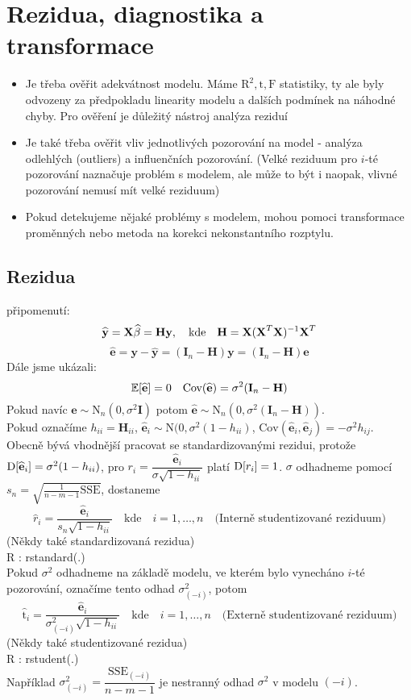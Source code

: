 \chapter{Rezidua, diagnostika a transformace}
\begin{itemize}
 \item Je třeba ověřit adekvátnost modelu. Máme $ \text{R}^{2} , \text{t}, \text{F} $ statistiky, ty ale byly odvozeny za předpokladu linearity modelu a dalších podmínek na náhodné chyby. Pro ověření je důležitý nástroj analýza reziduí
 \item Je také třeba ověřit vliv jednotlivých pozorování na model - analýza odlehlých (outliers) a influenčních pozorování. (Velké reziduum pro $ i $-té pozorování naznačuje problém s modelem, ale může to být i naopak, vlivné pozorování nemusí mít velké reziduum)
 \item Pokud detekujeme nějaké problémy s modelem, mohou pomoci transformace proměnných nebo metoda na korekci nekonstantního rozptylu.
\end{itemize}
\section{Rezidua}
připomenutí:
$$
 \widehat{\textbf{y}} = \textbf{X} \widehat{\beta} = \textbf{Hy} , \quad \text{kde} \quad \textbf{H} = \textbf{X} ( \textbf{X} ^{T} \textbf{X} )^{-1} \textbf{X} ^{T}
$$
$$
 \widehat{\textbf{e}} = \textbf{y} - \widehat{\textbf{y}} = ( \textbf{I}_n - \textbf{H} ) \textbf{y} =  ( \textbf{I}_n - \textbf{H} ) \textbf{e}
$$
Dále jsme ukázali:
$$
\mathbb{E} [ \widehat{\textbf{e}} ] = 0 \quad \text{Cov}(  \widehat{\textbf{e}} ) = \sigma^{2} ( \textbf{I}_n - \textbf{H} )
$$
Pokud navíc 
$
\textbf{e} \sim \text{N}_n ( 0 ,\sigma^{2} \textbf{I} ) $ potom $ \widehat{\textbf{e}} \sim \text{N}_n ( 0 ,\sigma^{2} ( \textbf{I}_n - \textbf{H})) 
$. \\ Pokud označíme $ h_{ii} = \textbf{H}_{ii} $, $ \widehat{\textbf{e}}_i \sim \text{N} ( 0 , \sigma^2 (1 - h_{ii} ) $, $ \text{Cov}( \widehat{\textbf{e}}_i , \widehat{\textbf{e}}_j  ) = -\sigma^2 h_{ij} $. \\
Obecně bývá vhodnější pracovat se standardizovanými rezidui, protože $ \mathrm{D} [  \widehat{\textbf{e}}_i ] = \sigma^2 (1 - h_{ii} ) $, pro $ r_i = \dfrac{\widehat{\textbf{e}}_i}{\sigma \sqrt{1-h_{ii}}} $ platí $ \mathrm{D} [ r_i ] = 1 $.
$ \sigma $ odhadneme pomocí $ s_n =  \sqrt{\frac{1}{n-m-1} \text{SSE}}$, dostaneme
$$
  \widehat{r}_i = \frac{\widehat{\textbf{e}}_i}{s_n \sqrt{1 - h_{ii}}} \quad \text{kde} \quad i = 1, \dots , n \quad \text{(Interně studentizované reziduum)}
$$
(Někdy také standardizovaná rezidua) \\
R : rstandard(.) \\
Pokud $ \sigma^2 $ odhadneme na základě modelu, ve kterém bylo vynecháno $ i $-té pozorování, označíme tento odhad $ \sigma^2_{(-i)} $, potom
$$
 \widehat{\text{t}}_i = \frac{\widehat{\textbf{e}}_i}{  \sigma^2_{(-i)} \sqrt{1 - h_{ii}}} \quad \text{kde} \quad i = 1, \dots , n \quad \text{(Externě studentizované reziduum)} 
$$
(Někdy také studentizované rezidua) \\
R : rstudent(.) \\
Například $ \sigma^2_{(-i)} = \dfrac{\text{SSE}_{(-i)}}{n-m-1} $ je nestranný odhad $ \sigma^2 $ v modelu $ (-i) $.

